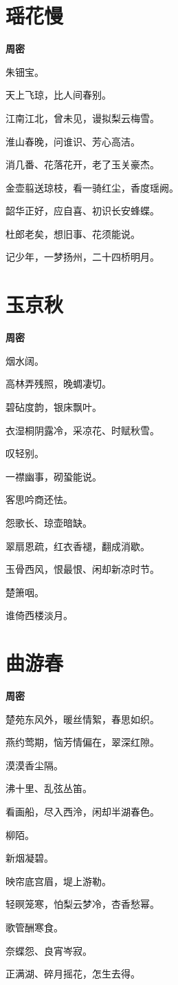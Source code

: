 \documentclass[12pt,a4paper]{ctexbook}
\begin{document}
\section{瑶花慢}
\textbf{周密}\par\vspace{0.5em}
朱钿宝。\par
天上飞琼，比人间春别。\par
江南江北，曾未见，谩拟梨云梅雪。\par
淮山春晚，问谁识、芳心高洁。\par
消几番、花落花开，老了玉关豪杰。\par
金壶翦送琼枝，看一骑红尘，香度瑶阙。\par
韶华正好，应自喜、初识长安蜂蝶。\par
杜郎老矣，想旧事、花须能说。\par
记少年，一梦扬州，二十四桥明月。\par

\section{玉京秋}
\textbf{周密}\par\vspace{0.5em}
烟水阔。\par
高林弄残照，晚蜩凄切。\par
碧砧度韵，银床飘叶。\par
衣湿桐阴露冷，采凉花、时赋秋雪。\par
叹轻别。\par
一襟幽事，砌蛩能说。\par
客思吟商还怯。\par
怨歌长、琼壶暗缺。\par
翠扇恩疏，红衣香褪，翻成消歇。\par
玉骨西风，恨最恨、闲却新凉时节。\par
楚箫咽。\par
谁倚西楼淡月。\par

\section{曲游春}
\textbf{周密}\par\vspace{0.5em}
楚苑东风外，暖丝情絮，春思如织。\par
燕约莺期，恼芳情偏在，翠深红隙。\par
漠漠香尘隔。\par
沸十里、乱弦丛笛。\par
看画船，尽入西泠，闲却半湖春色。\par
柳陌。\par
新烟凝碧。\par
映帘底宫眉，堤上游勒。\par
轻暝笼寒，怕梨云梦冷，杏香愁幂。\par
歌管酬寒食。\par
奈蝶怨、良宵岑寂。\par
正满湖、碎月摇花，怎生去得。\par
\end{document}
